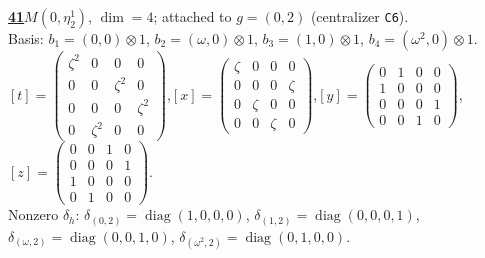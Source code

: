 \begin{samepage}\noindent\textbf{\underline{41}}\quad $M(0,\eta^{1}_{2})$, $\dim=4$; attached to $g=(0,2)$ (centralizer \texttt{C6}).\\
Basis: $b_{1}=(0,0)\otimes 1$, $b_{2}=(\omega,0)\otimes 1$, $b_{3}=(1,0)\otimes 1$, $b_{4}=(\omega^2,0)\otimes 1$.\\
$[t]=\left(\begin{smallmatrix} \zeta^2 & 0 & 0 & 0 \\ 0 & 0 & \zeta^2 & 0 \\ 0 & 0 & 0 & \zeta^2 \\ 0 & \zeta^2 & 0 & 0 \end{smallmatrix}\right)$,\quad $[x]=\left(\begin{smallmatrix} \zeta & 0 & 0 & 0 \\ 0 & 0 & 0 & \zeta \\ 0 & \zeta & 0 & 0 \\ 0 & 0 & \zeta & 0 \end{smallmatrix}\right)$,\quad $[y]=\left(\begin{smallmatrix} 0 & 1 & 0 & 0 \\ 1 & 0 & 0 & 0 \\ 0 & 0 & 0 & 1 \\ 0 & 0 & 1 & 0 \end{smallmatrix}\right)$,\quad $[z]=\left(\begin{smallmatrix} 0 & 0 & 1 & 0 \\ 0 & 0 & 0 & 1 \\ 1 & 0 & 0 & 0 \\ 0 & 1 & 0 & 0 \end{smallmatrix}\right)$.\\
Nonzero $\delta_h$: $\delta_{(0,2)}=\operatorname{diag}(1,0,0,0)$, $\delta_{(1,2)}=\operatorname{diag}(0,0,0,1)$, $\delta_{(\omega,2)}=\operatorname{diag}(0,0,1,0)$, $\delta_{(\omega^2,2)}=\operatorname{diag}(0,1,0,0)$.\end{samepage}
\medskip

